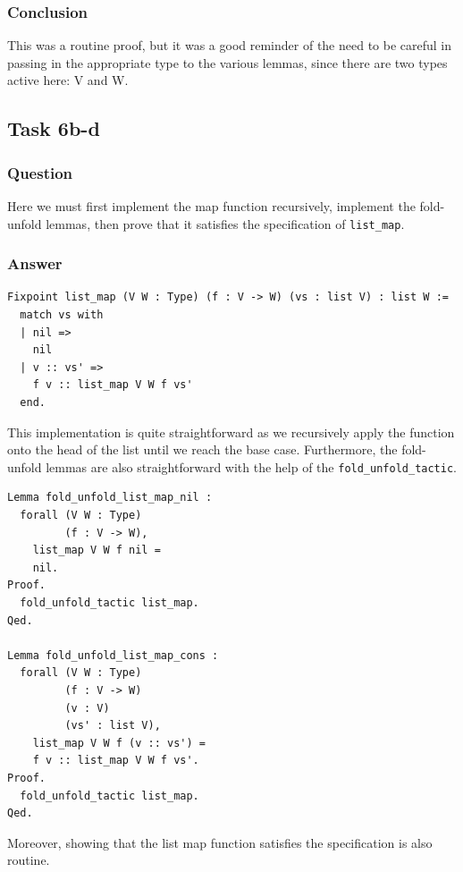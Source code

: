 \documentclass{article}
\begin{document}
\subsubsection{Conclusion}

This was a routine proof, but it was a good reminder of the need to be careful in passing in the appropriate type to the various lemmas, since there are two types active here: V and W.

\subsection{Task 6b-d}

\subsubsection{Question}

Here we must first implement the map function recursively, implement the fold-unfold lemmas, then prove that it satisfies the specification of \texttt{list\_map}.

\subsubsection{Answer}

\begin{lstlisting}
Fixpoint list_map (V W : Type) (f : V -> W) (vs : list V) : list W :=
  match vs with
  | nil =>
    nil
  | v :: vs' =>
    f v :: list_map V W f vs'
  end.
\end{lstlisting}

This implementation is quite straightforward as we recursively apply the function onto the head of the list until we reach the base case. Furthermore, the fold-unfold lemmas are also straightforward with the help of the \texttt{fold\_unfold\_tactic}.

\begin{lstlisting}
Lemma fold_unfold_list_map_nil :
  forall (V W : Type)
         (f : V -> W),
    list_map V W f nil =
    nil.
Proof.
  fold_unfold_tactic list_map.
Qed.

Lemma fold_unfold_list_map_cons :
  forall (V W : Type)
         (f : V -> W)
         (v : V)
         (vs' : list V),
    list_map V W f (v :: vs') =
    f v :: list_map V W f vs'.
Proof.
  fold_unfold_tactic list_map.
Qed.
\end{lstlisting}

Moreover, showing that the list map function satisfies the specification is also routine.
\end{document}
